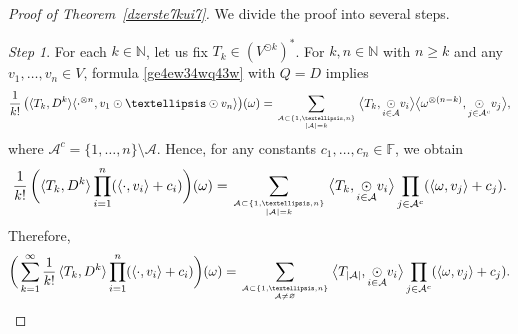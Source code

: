 \documentclass[10pt,a4paper]{amsart}
\begin{document}
\begin{proof}[Proof of Theorem~\ref{dzerste7kui7}] We divide the proof into several 
steps.

{\it Step 1}. For each $k\in\mathbb N$, let us fix  $T_k\in(V^{\odot k})^*$. For $k,n\in\mathbb N$ with $n\ge k$ and any $v_1,\dots,v_n\in V$, formula \eqref{ge4ew34wq43w} with $Q=D$ implies
$$ \frac1{k!}\,\big(\langle T_k ,D^{k}\rangle\langle\cdot ^{\otimes n},v_1\odot\dots\odot v_n\rangle\big)(\omega)=\sum_{{\mathcal A\subset\{1,\dots,n\}}\atop{|\mathcal A|=k}}\big\langle T_k ,\underset{i\in \mathcal A}\odot v_i\big\rangle\big\langle\omega^{\otimes(n-k)},\underset{j\in \mathcal A^c}\odot v_j\big\rangle,$$
where $\mathcal A^c=\{1,\dots,n\}\setminus\mathcal A$. Hence, for any constants $c_1,\dots,c_n\in\mathbb F$, we obtain
$$ \frac1{k!}\,\bigg(\langle T_k, D^{k}\rangle\prod_{i=1}^n(\langle\cdot,v_i\rangle+c_i)\bigg)(\omega)=\sum_{{\mathcal A\subset\{1,\dots,n\}}\atop{|\mathcal A|=k}}\big\langle T_k, \underset{i\in \mathcal A}\odot v_i\big\rangle\prod_{j\in\mathcal A^c}(\langle\omega,v_j\rangle+c_j).$$
Therefore,
\begin{equation}\label{dxters5ewu}
\bigg(\sum_{k=1}^\infty \frac 1{k!}\,\langle T_k, D^{k}\rangle\prod_{i=1}^n(\langle\cdot,v_i\rangle+c_i)\bigg)(\omega) =\sum_{{\mathcal A\subset\{1,\dots,n\}}\atop{\mathcal A\ne\varnothing}}\big\langle T_{|\mathcal A|}, \underset{i\in \mathcal A}\odot v_i\big\rangle\prod_{j\in\mathcal A^c}(\langle\omega,v_j\rangle+c_j).\end{equation}


\end{proof}
\end{document}

